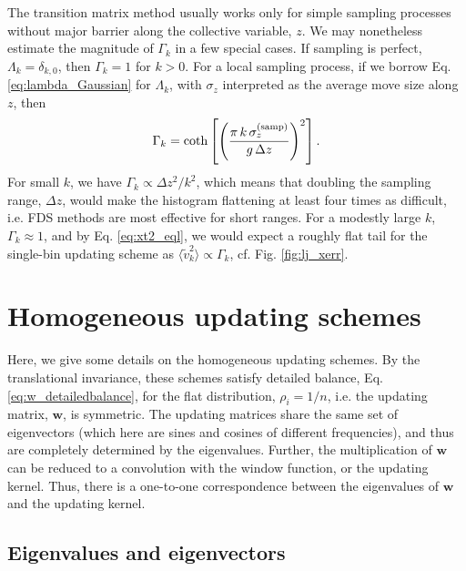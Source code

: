 \documentclass[reprint, superscriptaddress, floatfix]{revtex4-1}
\begin{document}
The transition matrix method usually works only for
simple sampling processes without major barrier
along the collective variable, $z$.
%
We may nonetheless estimate the magnitude of $\Gamma_k$
in a few special cases.
%
If sampling is perfect, $\Lambda_k = \delta_{k, 0}$,
then $\Gamma_k = 1$ for $k > 0$.
%
For a local sampling process,
if we borrow Eq. \eqref{eq:lambda_Gaussian}
for $\Lambda_k$,
with $\sigma_z$ interpreted as the average move size along $z$,
then
\begin{align}
\Gamma_k = \coth\left[
  \left(
    \frac{ \pi \, k \, \sigma_z^\mathrm{(samp)} } { g \, \Delta z}
  \right)^2
  \right].
  \notag
\end{align}
For small $k$,
we have $\Gamma_k \propto \Delta z^2/k^2$,\cite{bussi2006}
which means that doubling the sampling range, $\Delta z$,
would make the histogram flattening
at least four times as difficult,
i.e. FDS methods are most effective
for short ranges\cite{wang2001, *wang2001pre}.
%
%
For a modestly large $k$,
$\Gamma_k \approx 1$,
and by Eq. \eqref{eq:xt2_eql},
we would expect a roughly flat tail
for the single-bin updating scheme
as $\langle \tilde v_k^2 \rangle \propto \Gamma_k$,
cf. Fig. \ref{fig:lj_xerr}.





\section{\label{sec:more_wband}
Homogeneous updating schemes
}


Here, we give some details
on the homogeneous updating schemes.
%
By the translational invariance,
these schemes
satisfy detailed balance,
Eq. \eqref{eq:w_detailedbalance},
for the flat distribution, $\rho_i = 1/n$,
i.e. the updating matrix, $\mathbf w$,
is symmetric.
%
The updating matrices
share the same set of eigenvectors
(which here are sines and cosines of different frequencies),
and thus are completely determined
by the eigenvalues.
%
Further, the multiplication of $\mathbf w$
can be reduced to a convolution with the window function,
or the updating kernel.
%
Thus,
there is a one-to-one correspondence between
the eigenvalues of $\mathbf w$
and the updating kernel.



\subsection{\label{sec:wband_eig}
Eigenvalues and eigenvectors}
\end{document}
